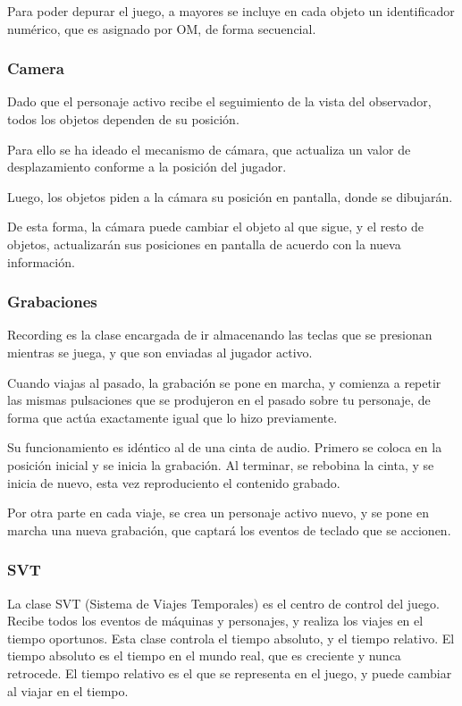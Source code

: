 \documentclass[11pt,a4paper]{article}
\begin{document}
Para poder depurar el juego, a mayores se incluye en cada objeto un 
identificador numérico, que es asignado por OM, de forma secuencial.

\subsubsection{Camera}
Dado que el personaje activo recibe el seguimiento de la vista del observador, 
todos los objetos dependen de su posición.

Para ello se ha ideado el mecanismo de cámara, que actualiza un valor de 
desplazamiento conforme a la posición del jugador.

Luego, los objetos piden a la cámara su posición en pantalla, donde se 
dibujarán.

De esta forma, la cámara puede cambiar el objeto al que sigue, y el resto de 
objetos, actualizarán sus posiciones en pantalla de acuerdo con la nueva 
información.

\subsubsection{Grabaciones}

Recording es la clase encargada de ir almacenando las teclas que se presionan 
mientras se juega, y que son enviadas al jugador activo.

Cuando viajas al pasado, la grabación se pone en marcha, y comienza a repetir 
las mismas pulsaciones que se produjeron en el pasado sobre tu personaje, de 
forma que actúa exactamente igual que lo hizo previamente.

Su funcionamiento es idéntico al de una cinta de audio. Primero se coloca en la 
posición inicial y se inicia la grabación. Al terminar, se rebobina la cinta, y 
se inicia de nuevo, esta vez reproduciento el contenido grabado.

Por otra parte en cada viaje, se crea un personaje activo nuevo, y se pone en 
marcha una nueva grabación, que captará los eventos de teclado que se accionen.

\subsubsection{SVT}

La clase SVT (Sistema de Viajes Temporales) es el centro de control del juego.  
Recibe todos los eventos de máquinas y personajes, y realiza los viajes en el 
tiempo oportunos. Esta clase controla el tiempo absoluto, y el tiempo relativo.
El tiempo absoluto es el tiempo en el mundo real, que es creciente y nunca 
retrocede. El tiempo relativo es el que se representa en el juego, y puede 
cambiar al viajar en el tiempo.
\end{document}
